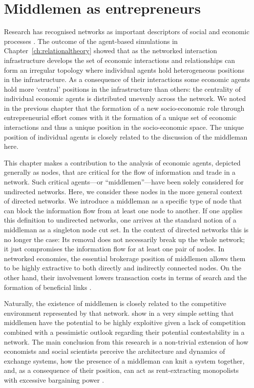 \chapter{Middlemen as entrepreneurs}
\label{ch:criticalnodes}

Research has recognised networks as important descriptors of social and economic processes \citep{Watts2004,Jackson2008,Newman2010}. The outcome of the agent-based simulations in Chapter~\ref{ch:relationaltheory} showed that as the networked interaction infrastructure develops the set of economic interactions and relationships can form an irregular topology where individual agents hold heterogeneous positions in the infrastructure. As a consequence of their interactions some economic agents hold more `central' positions in the infrastructure than others: the centrality of individual economic agents is distributed unevenly across the network. We noted in the previous chapter that the formation of a new socio-economic role through entrepreneurial effort comes with it the formation of a unique set of economic interactions and thus a unique position in the socio-economic space. The unique position of individual agents is closely related to the discussion of the middleman here.

This chapter makes a contribution to the analysis of economic agents, depicted generally as nodes, that are critical for the flow of information and trade in a network. Such critical agents---or ``middlemen''---have been solely considered for undirected networks. Here, we consider these nodes in the more general context of directed networks. We introduce a middleman as a specific type of node that can block the information flow from at least one node to another. If one applies this definition to undirected networks, one arrives at the standard notion of a middleman as a singleton node cut set. In the context of directed networks this is no longer the case: Its removal does not necessarily break up the whole network; it just compromises the information flow for at least one pair of nodes. In networked economies, the essential brokerage position of middlemen allows them to be highly extractive to both directly and indirectly connected nodes. On the other hand, their involvement lowers transaction costs in terms of search and the formation of beneficial links \citep{Burt1992}.

Naturally, the existence of middlemen is closely related to the competitive environment represented by that network. \citet{GillesDiamantaris2013} show in a very simple setting that middlemen have the potential to be highly exploitive given a lack of competition combined with a pessimistic outlook regarding their potential contestability in a network. The main conclusion from this research is a non-trivial extension of how economists and social scientists perceive the architecture and dynamics of exchange systems, how the presence of a middleman can knit a system together, and, as a consequence of their position, can act as rent-extracting monopolists with excessive bargaining power \citep[Chapter~11]{EasleyKleinberg2010}.

